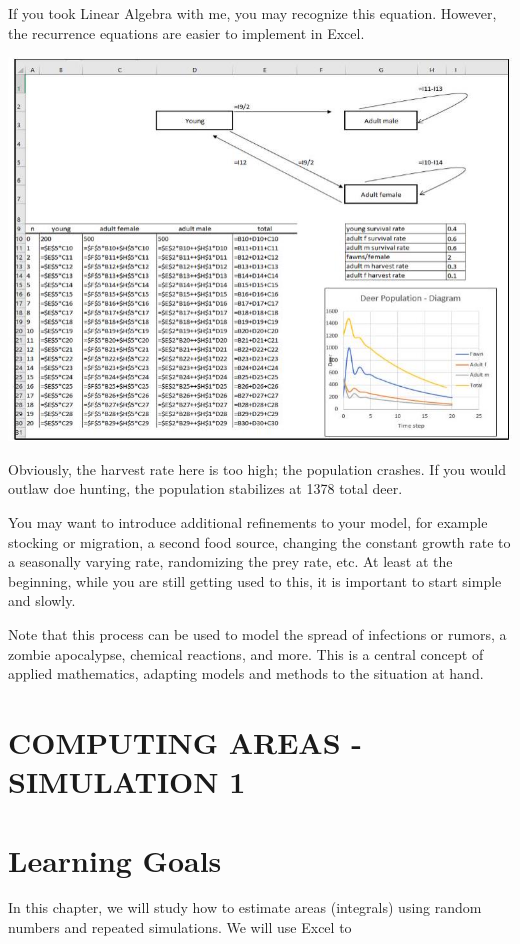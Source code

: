 \documentclass[10pt]{article}
\begin{document}
If you took Linear Algebra with me, you may recognize this equation. However, the recurrence equations are easier to implement in Excel.

\includegraphics[max width=\textwidth]{2022_07_05_5945264bba2a5f6ba667g-17}

Obviously, the harvest rate here is too high; the population crashes. If you would outlaw doe hunting, the population stabilizes at 1378 total deer.

You may want to introduce additional refinements to your model, for example stocking or migration, a second food source, changing the constant growth rate to a seasonally varying rate, randomizing the prey rate, etc. At least at the beginning, while you are still getting used to this, it is important to start simple and slowly.

Note that this process can be used to model the spread of infections or rumors, a zombie apocalypse, chemical reactions, and more. This is a central concept of applied mathematics, adapting models and methods to the situation at hand.

\section{COMPUTING AREAS - SIMULATION 1}
\section{Learning Goals}
In this chapter, we will study how to estimate areas (integrals) using random numbers and repeated simulations. We will use Excel to
\end{document}

